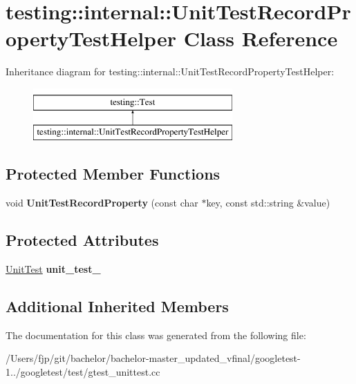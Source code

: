 \hypertarget{classtesting_1_1internal_1_1_unit_test_record_property_test_helper}{}\section{testing\+:\+:internal\+:\+:Unit\+Test\+Record\+Property\+Test\+Helper Class Reference}
\label{classtesting_1_1internal_1_1_unit_test_record_property_test_helper}
Inheritance diagram for testing\+:\+:internal\+:\+:Unit\+Test\+Record\+Property\+Test\+Helper\+:\begin{figure}[H]
\begin{center}
\leavevmode
\includegraphics[height=2.000000cm]{classtesting_1_1internal_1_1_unit_test_record_property_test_helper}
\end{center}
\end{figure}
\subsection*{Protected Member Functions}
\begin{DoxyCompactItemize}
\item 
\mbox{\label{classtesting_1_1internal_1_1_unit_test_record_property_test_helper_a9c5432d080faf13a1db6baff0a2944f4}} 
void {\bfseries Unit\+Test\+Record\+Property} (const char $\ast$key, const std\+::string \&value)
\end{DoxyCompactItemize}
\subsection*{Protected Attributes}
\begin{DoxyCompactItemize}
\item 
\mbox{\label{classtesting_1_1internal_1_1_unit_test_record_property_test_helper_a415e13a354d3b8bd97db96aae5ef5df1}} 
\mbox{\hyperlink{classtesting_1_1_unit_test}{Unit\+Test}} {\bfseries unit\+\_\+test\+\_\+}
\end{DoxyCompactItemize}
\subsection*{Additional Inherited Members}


The documentation for this class was generated from the following file\+:\begin{DoxyCompactItemize}
\item 
/\+Users/fjp/git/bachelor/bachelor-\/master\+\_\+updated\+\_\+vfinal/googletest-\/1../googletest/test/gtest\+\_\+unittest.\+cc\end{DoxyCompactItemize}
